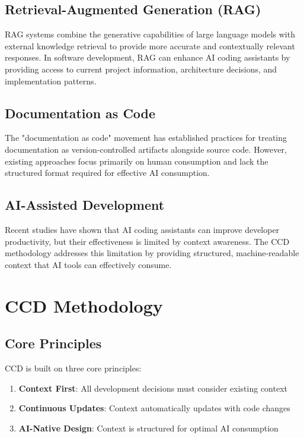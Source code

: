 \documentclass[11pt,a4paper]{article}
\begin{document}
\subsection{Retrieval-Augmented Generation (RAG)}

RAG systems combine the generative capabilities of large language models with external knowledge retrieval to provide more accurate and contextually relevant responses. In software development, RAG can enhance AI coding assistants by providing access to current project information, architecture decisions, and implementation patterns.

\subsection{Documentation as Code}

The "documentation as code" movement has established practices for treating documentation as version-controlled artifacts alongside source code. However, existing approaches focus primarily on human consumption and lack the structured format required for effective AI consumption.

\subsection{AI-Assisted Development}

Recent studies have shown that AI coding assistants can improve developer productivity, but their effectiveness is limited by context awareness. The CCD methodology addresses this limitation by providing structured, machine-readable context that AI tools can effectively consume.

\section{CCD Methodology}

\subsection{Core Principles}

CCD is built on three core principles:

\begin{enumerate}
    \item \textbf{Context First}: All development decisions must consider existing context
    \item \textbf{Continuous Updates}: Context automatically updates with code changes
    \item \textbf{AI-Native Design}: Context is structured for optimal AI consumption
\end{enumerate}
\end{document}
